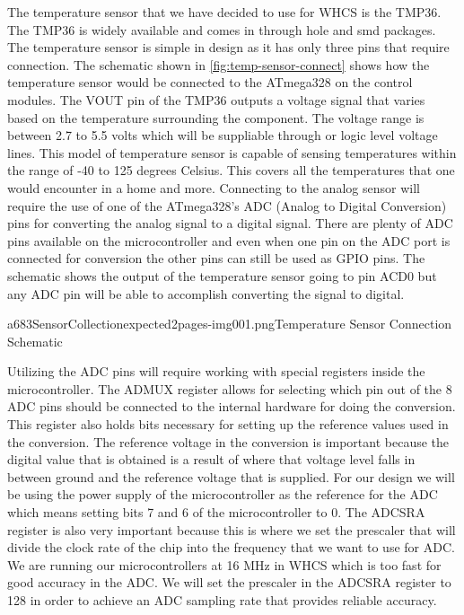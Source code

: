 The temperature sensor that we have decided to use for WHCS is the TMP36. The
TMP36 is widely available and comes in through hole and smd packages. The
temperature sensor is simple in design as it has only three pins that require
connection. The schematic shown in \autoref{fig:temp-sensor-connect} shows how the
temperature sensor would be connected to the ATmega328 on the control modules.
The VOUT pin of the TMP36 outputs a voltage signal that varies based on the
temperature surrounding the component. The voltage range is between 2.7 to 5.5
volts which will be suppliable through or logic level voltage lines. This model
of temperature sensor is capable of sensing temperatures within the range of
{}-40 to 125 degrees Celsius. This covers all the temperatures that one would
encounter in a home and more. Connecting to the analog sensor will require the
use of one of the ATmega328's ADC (Analog to Digital Conversion) pins for
converting the analog signal to a digital signal. There are plenty of ADC pins
available on the microcontroller and even when one pin on the ADC port is
connected for conversion the other pins can still be used as GPIO pins. The
schematic shows the output of the temperature sensor going to pin ACD0 but any
ADC pin will be able to accomplish converting the signal to digital.

{a683SensorCollectionexpected2pages-img001.png}{Temperature Sensor Connection Schematic}

Utilizing the ADC pins will require working with special registers inside the
microcontroller. The ADMUX register allows for selecting which pin out of the 8
ADC pins should be connected to the internal hardware for doing the conversion.
This register also holds bits necessary for setting up the reference values
used in the conversion. The reference voltage in the conversion is important
because the digital value that is obtained is a result of where that voltage
level falls in between ground and the reference voltage that is supplied. For
our design we will be using the power supply of the microcontroller as the
reference for the ADC which means setting bits 7 and 6 of the microcontroller
to 0. The ADCSRA register is also very important because this is where we set
the prescaler that will divide the clock rate of the chip into the frequency
that we want to use for ADC. We are running our microcontrollers at 16 MHz in
WHCS which is too fast for good accuracy in the ADC. We will set the prescaler
in the ADCSRA register to 128 in order to achieve an ADC sampling rate that
provides reliable accuracy.

